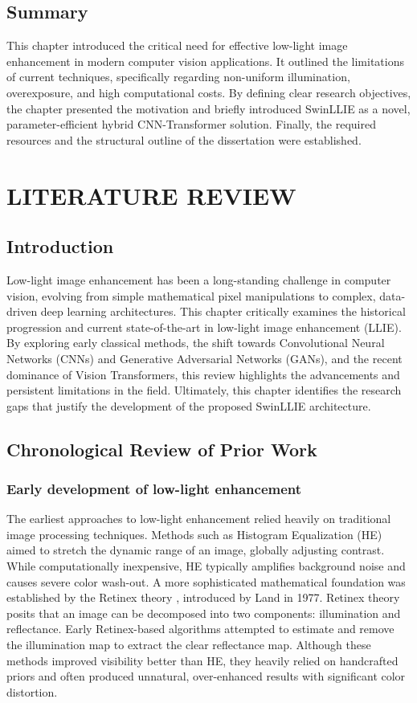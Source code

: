 \documentclass[12pt, a4paper]{report}
\begin{document}
\section{Summary}
This chapter introduced the critical need for effective low-light image enhancement in modern computer vision applications. It outlined the limitations of current techniques, specifically regarding non-uniform illumination, overexposure, and high computational costs. By defining clear research objectives, the chapter presented the motivation and briefly introduced SwinLLIE as a novel, parameter-efficient hybrid CNN-Transformer solution. Finally, the required resources and the structural outline of the dissertation were established.


\chapter{LITERATURE REVIEW}
\section{Introduction}
Low-light image enhancement has been a long-standing challenge in computer vision, evolving from simple mathematical pixel manipulations to complex, data-driven deep learning architectures. This chapter critically examines the historical progression and current state-of-the-art in low-light image enhancement (LLIE). By exploring early classical methods, the shift towards Convolutional Neural Networks (CNNs) and Generative Adversarial Networks (GANs), and the recent dominance of Vision Transformers, this review highlights the advancements and persistent limitations in the field. Ultimately, this chapter identifies the research gaps that justify the development of the proposed SwinLLIE architecture.

\section{Chronological Review of Prior Work}

\subsection{Early development of low-light enhancement}
The earliest approaches to low-light enhancement relied heavily on traditional image processing techniques. Methods such as Histogram Equalization (HE) aimed to stretch the dynamic range of an image, globally adjusting contrast. While computationally inexpensive, HE typically amplifies background noise and causes severe color wash-out. A more sophisticated mathematical foundation was established by the Retinex theory \cite{land1977retinex}, introduced by Land in 1977. Retinex theory posits that an image can be decomposed into two components: illumination and reflectance. Early Retinex-based algorithms attempted to estimate and remove the illumination map to extract the clear reflectance map. Although these methods improved visibility better than HE, they heavily relied on handcrafted priors and often produced unnatural, over-enhanced results with significant color distortion.
\end{document}
